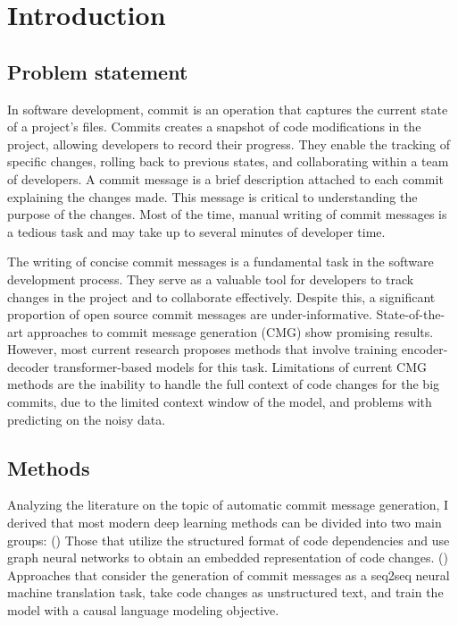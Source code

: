 \chapter{Introduction}\label{chap:intro}

\section{Problem statement}
In software development, commit is an operation that captures the current state of a project's files. Commits creates a snapshot of code modifications in the project, allowing developers to record their progress. They enable the tracking of specific changes, rolling back to previous states, and collaborating within a team of developers.
A commit message is a brief description attached to each commit explaining the changes made. This message is critical to understanding the purpose of the changes. Most of the time, manual writing of commit messages is a tedious task and may take up to several minutes of developer time. 

The writing of concise commit messages is a fundamental task in the software development process. They serve as a valuable tool for developers to track changes in the project and to collaborate effectively. Despite this, a significant proportion of open source commit messages are under-informative. State-of-the-art approaches to commit message generation (CMG) show promising results. However, most current research proposes methods that involve training encoder-decoder transformer-based models for this task. 
Limitations of current CMG methods are the inability to handle the full context of code changes for the big commits, due to the limited context window of the model, and problems with predicting on the noisy data. 

\section{Methods}
Analyzing the literature on the topic of automatic commit message generation, I derived that most modern deep learning methods can be divided into two main groups: () Those that utilize the structured format of code dependencies and use graph neural networks to obtain an embedded representation of code changes. () Approaches that consider the generation of commit messages as a seq2seq neural machine translation task, take code changes as unstructured text, and train the model with a causal language modeling objective. 

